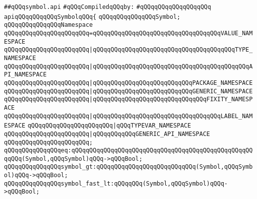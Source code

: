 \label{src/lib/compiler/front/basics/map/symbol.api}
\verb|##qQQqsymbol.api|\newline
\newline
\verb|#qQQqCompiledqQQqby:|\newline
\verb|#qQQqqQQqqQQqqQQqqQQq|\newline
\newline
\newline
\newline
\verb|apiqQQqqQQqqQQqSymbolqQQq{|\newline
\newline
\verb|qQQqqQQqqQQqqQQqSymbol;|\newline
\newline
\verb|qQQqqQQqqQQqqQQqNamespace|\newline
\verb|qQQqqQQqqQQqqQQqqQQqqQQq=qQQqqQQqqQQqqQQqqQQqqQQqqQQqqQQqqQQqVALUE_NAMESPACE|\newline
\verb|qQQqqQQqqQQqqQQqqQQqqQQq|\verb#|qQQqqQQqqQQqqQQqqQQqqQQqqQQqqQQqqQQqqQQqTYPE_NAMESPACE#\newline
\verb|qQQqqQQqqQQqqQQqqQQqqQQq|\verb#|qQQqqQQqqQQqqQQqqQQqqQQqqQQqqQQqqQQqqQQqqQQqAPI_NAMESPACE#\newline
\verb|qQQqqQQqqQQqqQQqqQQqqQQq|\verb#|qQQqqQQqqQQqqQQqqQQqqQQqqQQqPACKAGE_NAMESPACE#\newline
\verb|qQQqqQQqqQQqqQQqqQQqqQQq|\verb#|qQQqqQQqqQQqqQQqqQQqqQQqqQQqGENERIC_NAMESPACE#\newline
\verb|qQQqqQQqqQQqqQQqqQQqqQQq|\verb#|qQQqqQQqqQQqqQQqqQQqqQQqqQQqqQQqFIXITY_NAMESPACE#\newline
\verb|qQQqqQQqqQQqqQQqqQQqqQQq|\verb#|qQQqqQQqqQQqqQQqqQQqqQQqqQQqqQQqqQQqLABEL_NAMESPACE#\newline
\verb|qQQqqQQqqQQqqQQqqQQqqQQq|\verb#|qQQqTYPEVAR_NAMESPACE#\newline
\verb|qQQqqQQqqQQqqQQqqQQqqQQq|\verb#|qQQqqQQqqQQqGENERIC_API_NAMESPACE#\newline
\verb|qQQqqQQqqQQqqQQqqQQqqQQq;|\newline
\newline
\verb|qQQqqQQqqQQqqQQqeq:qQQqqQQqqQQqqQQqqQQqqQQqqQQqqQQqqQQqqQQqqQQqqQQqqQQqqQQq(Symbol,qQQqSymbol)qQQq->qQQqBool;|\newline
\verb|qQQqqQQqqQQqqQQqsymbol_gt:qQQqqQQqqQQqqQQqqQQqqQQqqQQq(Symbol,qQQqSymbol)qQQq->qQQqBool;|\newline
\verb|qQQqqQQqqQQqqQQqsymbol_fast_lt:qQQqqQQq(Symbol,qQQqSymbol)qQQq->qQQqBool;|\newline
